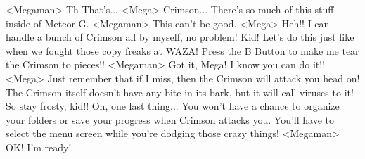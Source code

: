 <Megaman> Th-That's... 
<Mega> Crimson... 
There's so much of this stuff inside of Meteor G. 
<Megaman> This can't be good. 
<Mega> Heh!! 
I can handle a bunch of Crimson all by myself, no problem! 
Kid! Let's do this just like when we fought those copy freaks at WAZA! 
Press the B Button to make me tear the Crimson to pieces!! 
<Megaman> Got it, Mega! I know you can do it!! 
<Mega> Just remember that if I miss, then the Crimson will attack you head on! 
The Crimson itself doesn't have any bite in its bark, but it will call viruses to it! 
So stay frosty, kid!! 
Oh, one last thing... You won't have a chance to organize your folders or 
save your progress when Crimson attacks you. 
You'll have to select the menu screen while you're dodging those crazy things! 
<Megaman> OK! I'm ready! 
